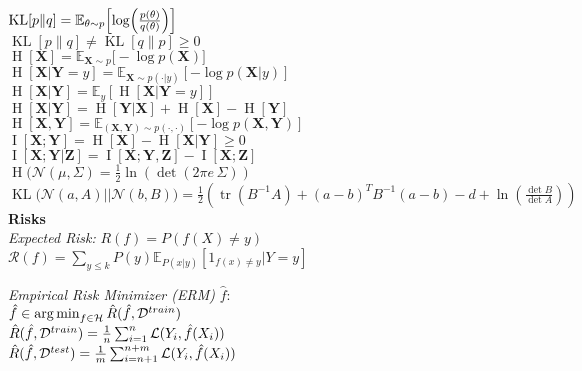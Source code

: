 $\operatorname{KL}[p \| q] = \mathbb{E}_{\theta \sim p}\Bigl[\log\Bigl(\tfrac{p(\theta)}{q(\theta)}\Bigr)\Bigr]$ \\
$\operatorname{KL}[p \| q] \neq \operatorname{KL}[q \| p] \geq 0$ \\
$\operatorname{H}[\mathbf{X}] = \mathbb{E}_{\mathbf{X} \sim p}\bigl[-\log p(\mathbf{X})\bigr]$ \\
$\operatorname{H}[\mathbf{X} | \mathbf{Y} = y] = \mathbb{E}_{\mathbf{X} \sim p(\cdot | y)} \left[ -\log p(\mathbf{X} | y) \right]$ \\
$\operatorname{H}[\mathbf{X} | \mathbf{Y}] = \mathbb{E}_{y} \left[ \operatorname{H}[\mathbf{X} | \mathbf{Y} = y] \right] $ \\
$\operatorname{H}[\mathbf{X} | \mathbf{Y}] = \operatorname{H}[\mathbf{Y} | \mathbf{X}] {+} \operatorname{H}[\mathbf{X}] {-} \operatorname{H}[\mathbf{Y}]$ \\
$\operatorname{H}[\mathbf{X}, \mathbf{Y}] {=} \mathbb{E}_{(\mathbf{X}, \mathbf{Y}) \sim p(\cdot, \cdot)} \left[ - \log p(\mathbf{X}, \mathbf{Y}) \right]$ \\
$\operatorname{I}[\mathbf{X}; \mathbf{Y}] = \operatorname{H}[\mathbf{X}] - \operatorname{H}[\mathbf{X} | \mathbf{Y}] \geq 0 $  \\
$\operatorname{I}[\mathbf{X}; \mathbf{Y} | \mathbf{Z}] = \operatorname{I}[\mathbf{X}; \mathbf{Y}, \mathbf{Z}] - \operatorname{I}[\mathbf{X}; \mathbf{Z}]$ \\
$\operatorname{H}\bigl(\mathcal{N}(\mu, \Sigma) = \tfrac{1}{2}\ln(\det (2\pi e\,\Sigma))$ \\
$\operatorname{KL}\bigl(\mathcal{N}(a, A) || \mathcal{N}(b, B)\bigr) = \frac{1}{2}(\operatorname{tr}(B^{-1}A) + (a - b)^T B^{-1} (a - b) - d + \ln(\frac{\det B}{\det A}))$ \\

\textbf{Risks} \\
\textit{Expected Risk:} $R(f) = P(f (X) \neq y)$ \\
$\mathcal{R}(f) = \sum_{y \leq  k}P(y)\mathbb{E}_{P(x|y)}[1_{{f(x) \neq y}}| Y = y]$

\textit{Empirical Risk Minimizer (ERM)} $\hat{f}$:\\
$\hat{f} \in \operatorname*{arg\,min}_{f \in \mathcal{H}} \hat{R}(\hat{f}, \mathcal{D}^{train})$\\
$\hat{R}(\hat{f}, \mathcal{D}^{train}) = \frac{1}{n} \sum_{i=1}^n \mathcal{L}(Y_i, \hat{f}(X_i))$\\
$\hat{R}(\hat{f}, \mathcal{D}^{test}) = \frac{1}{m} \sum_{i=n+1}^{n+m} \mathcal{L}(Y_i, \hat{f}(X_i))$

